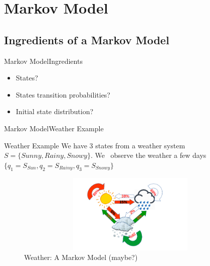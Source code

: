 \documentclass[10pt]{beamer}
\begin{document}
\section{Markov Model}
\subsection{Ingredients of a Markov Model}
\begin{frame}{Markov Model}{Ingredients}
  \begin{itemize}
    \item States?
    \item States transition probabilities?
    \item Initial state distribution? 
  \end{itemize}
\end{frame}

\begin{frame}{Markov Model}{Weather Example}
  \begin{block}{Weather Example}
     We have 3 states from a weather system $S = \{Sunny, Rainy, Snowy\}$. We \
     observe the weather a few days \
     $\{q_1 = S_{Sun}, q_2 = S_{Rainy}, q_3 = S_{Snowy}\}$
  \end{block}
  \begin{figure}[h]
    \centering
    \includegraphics[width=4.5in,height=1.5in]{figures/weather_example.png}
    \caption {Weather: A Markov Model (maybe?)}
  \end{figure}
\end{frame}

\end{document}
